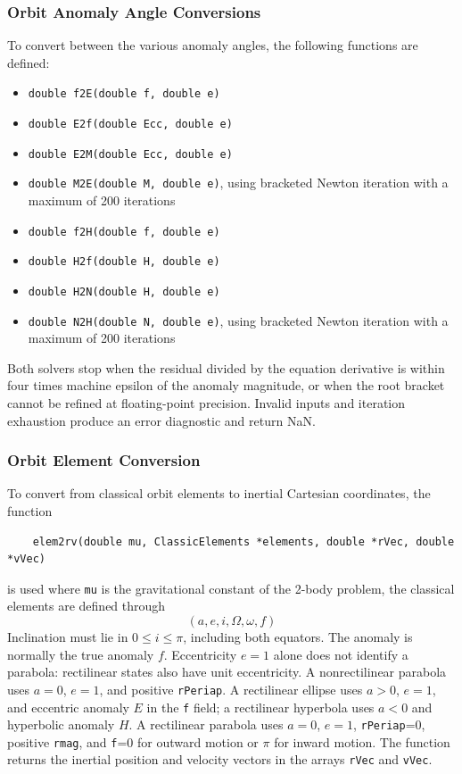 \subsubsection{Orbit Anomaly Angle Conversions}
To convert between the various anomaly angles, the following functions are defined:
\begin{itemize}
	\item {\tt double f2E(double f, double e)}
	\item {\tt double E2f(double Ecc, double e)}
	\item {\tt double E2M(double Ecc, double e)}
	\item {\tt double M2E(double M, double e)}, using bracketed Newton iteration with a maximum of 200 iterations
	\item {\tt double f2H(double f, double e)}
	\item {\tt double H2f(double H, double e)}
	\item {\tt double H2N(double H, double e)}
	\item {\tt double N2H(double N, double e)}, using bracketed Newton iteration with a maximum of 200 iterations
\end{itemize}
Both solvers stop when the residual divided by the equation derivative is within
four times machine epsilon of the anomaly magnitude, or when the root bracket
cannot be refined at floating-point precision. Invalid inputs and iteration
exhaustion produce an error diagnostic and return NaN.



\subsubsection{Orbit Element Conversion}
To convert from classical orbit elements to inertial Cartesian coordinates, the function
\begin{verbatim}
	elem2rv(double mu, ClassicElements *elements, double *rVec, double *vVec)
\end{verbatim}
is used where {\tt mu} is the gravitational constant of the 2-body problem, the classical elements are defined through
$$
	(a, e, i, \Omega, \omega, f)
$$
Inclination must lie in $0\le i\le\pi$, including both equators.
The anomaly is normally the true anomaly $f$. Eccentricity $e=1$ alone does
not identify a parabola: rectilinear states also have unit eccentricity.
A nonrectilinear parabola uses $a=0$, $e=1$, and positive {\tt rPeriap}.
A rectilinear ellipse uses $a>0$, $e=1$, and eccentric anomaly $E$ in the
{\tt f} field; a rectilinear hyperbola uses $a<0$ and hyperbolic anomaly $H$.
A rectilinear parabola uses $a=0$, $e=1$, {\tt rPeriap}=0, positive
{\tt rmag}, and {\tt f}=0 for outward motion or $\pi$ for inward motion.  The function returns the inertial position and velocity vectors in the arrays {\tt rVec} and {\tt vVec}.

